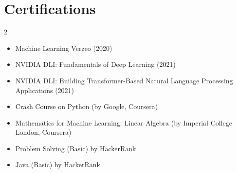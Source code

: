 \documentclass[letterpaper,11pt]{article}
\newcommand{\resumeSubHeadingListStart}{\begin{itemize}[leftmargin=0.0in, label={}]}
\begin{document}
\section{Certifications}
        \begin{multicols}{2}
            \begin{itemize}[itemsep=-2pt, parsep=5pt]
                \item\small Machine Learning Verzeo (2020) \href{https://drive.google.com/file/d/14UjyYz909mm0VzusHEavU-tFgHup6F0t/view?usp=sharing}{\raisebox{-0.2\height}\faExternalLink}
                \item NVIDIA DLI: Fundamentals of Deep Learning (2021) \href{https://drive.google.com/file/d/1zeKjxzR76iYmwS9dkHSk63teXYiZ7rNu/view?usp=sharing}{\raisebox{-0.2\height}\faExternalLink}
                \item NVIDIA DLI: Building Transformer-Based Natural  Language Processing Applications (2021) \href{https://drive.google.com/file/d/1xHU2gKfxvsWt91uc0PsrlpMoUMk3a4Qg/view?usp=sharing}{\raisebox{-0.2\height}\faExternalLink}
                \item Crash Course on Python (by Google, Coursera) \href{https://www.coursera.org/account/accomplishments/certificate/R8G6RHT3QN29}{\raisebox{-0.2\height}\faExternalLink}
                \item Mathematics for Machine Learning: Linear Algebra (by Imperial College London, Coursera) \href{https://www.coursera.org/account/accomplishments/certificate/APUAX7VRYQGZ}{\raisebox{-0.2\height}\faExternalLink}
                \item Problem Solving (Basic) by HackerRank \href{https://www.hackerrank.com/certificates/1e1491d29802}{\raisebox{-0.2\height}\faExternalLink}
                \item Java (Basic) by HackerRank \href{https://www.hackerrank.com/certificates/790db20ba82a}{\raisebox{-0.2\height}\faExternalLink}
            \end{itemize}
        \end{multicols}
\end{document}
